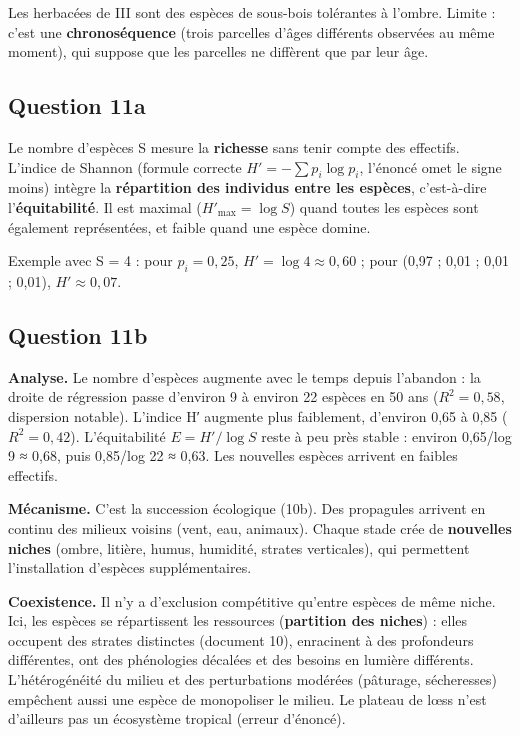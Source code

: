\documentclass[11pt,a4paper]{article}
\begin{document}
Les herbacées de III sont des espèces de sous-bois tolérantes à l'ombre. Limite : c'est une \textbf{chronoséquence} (trois parcelles d'âges différents observées au même moment), qui suppose que les parcelles ne diffèrent que par leur âge.

\hypertarget{question-11a}{%
\subsection{Question 11a}\label{question-11a}}

Le nombre d'espèces S mesure la \textbf{richesse} sans tenir compte des effectifs. L'indice de Shannon (formule correcte \(H'=-\sum p_i\log p_i\), l'énoncé omet le signe moins) intègre la \textbf{répartition des individus entre les espèces}, c'est-à-dire l'\textbf{équitabilité}. Il est maximal (\(H'_{\max}=\log S\)) quand toutes les espèces sont également représentées, et faible quand une espèce domine.

Exemple avec S = 4 : pour \(p_i=0{,}25\), \(H'=\log 4\approx0{,}60\) ; pour (0,97 ; 0,01 ; 0,01 ; 0,01), \(H'\approx0{,}07\).

\hypertarget{question-11b}{%
\subsection{Question 11b}\label{question-11b}}

\textbf{Analyse.} Le nombre d'espèces augmente avec le temps depuis l'abandon : la droite de régression passe d'environ 9 à environ 22 espèces en 50 ans (\(R^2=0{,}58\), dispersion notable). L'indice H′ augmente plus faiblement, d'environ 0,65 à 0,85 (\(R^2=0{,}42\)). L'équitabilité \(E=H'/\log S\) reste à peu près stable : environ 0,65/log 9 ≈ 0,68, puis 0,85/log 22 ≈ 0,63. Les nouvelles espèces arrivent en faibles effectifs.

\textbf{Mécanisme.} C'est la succession écologique (10b). Des propagules arrivent en continu des milieux voisins (vent, eau, animaux). Chaque stade crée de \textbf{nouvelles niches} (ombre, litière, humus, humidité, strates verticales), qui permettent l'installation d'espèces supplémentaires.

\textbf{Coexistence.} Il n'y a d'exclusion compétitive qu'entre espèces de même niche. Ici, les espèces se répartissent les ressources (\textbf{partition des niches}) : elles occupent des strates distinctes (document 10), enracinent à des profondeurs différentes, ont des phénologies décalées et des besoins en lumière différents. L'hétérogénéité du milieu et des perturbations modérées (pâturage, sécheresses) empêchent aussi une espèce de monopoliser le milieu. Le plateau de lœss n'est d'ailleurs pas un écosystème tropical (erreur d'énoncé).
\end{document}
